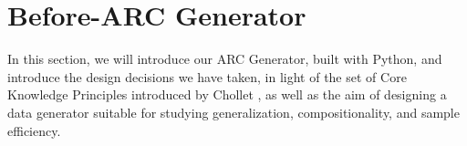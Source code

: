 \section{Before-ARC Generator}

In this section, we will introduce our ARC Generator, built with Python, and introduce the design decisions we have taken, in light of the set of Core Knowledge Principles introduced by Chollet \cite{cholletARC}, as well as the aim of designing a data generator suitable for studying generalization, compositionality, and sample efficiency.











